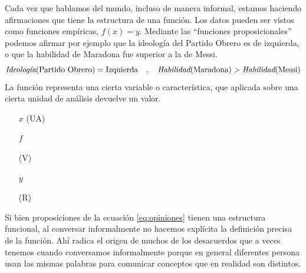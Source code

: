 \documentclass[a4paper,10pt]{book}
\newif\ifen
\newif\ifes
\newcommand{\en}[1]{\ifen#1\fi}
\newcommand{\es}[1]{\ifes#1\fi}
\begin{document}
Cada vez que hablamos del mundo, incluso de manera informal, estamos haciendo afirmaciones que tiene la estructura de una función.
%
Los datos pueden ser vistos como funciones empíricas, $f(x)=y$.
%
Mediante las ``funciones proposicionales'' podemos afirmar por ejemplo que la ideología del Partido Obrero es de izquierda, o que la habilidad de Maradona fue superior a la de Messi.
%
\begin{equation}\label{eq:opiniones}
 \emph{Ideología}(\text{Partido Obrero}) = \text{Izquierda} \  \ \ , \ \ \ \emph{Habilidad}(\text{Maradona}) > \emph{Habilidad}(\text{Messi})
\end{equation}
%
La función representa una cierta variable o característica, que aplicada sobre una cierta unidad de análisis devuelve un valor.
%
\begin{itemize}  \setlength\itemsep{0cm}
 \item[$x$] 
    \textbf{\en{Unit of analysis}} (UA)
 \item[$f$] 
   \en{\textbf{Variable} of the unit of analysis}
   \es{\textbf{Variable} de la unidad de análisis} (V)
 \item[$y$] 
   \en{\textbf{Value} of the variable}
   \es{\textbf{Resultado} o valor de la variable} (R)
\end{itemize}

Si bien proposiciones de la ecuación \ref{eq:opiniones} tienen una estructura funcional, al conversar informalmente no hacemos explícita la definición precisa de la función.
%
Ahí radica el origen de muchos de los desacuerdos que a veces tenemos cuando conversamos informalmente porque en general diferentes persona usan las mismas palabras para comunicar conceptos que en realidad son distintos.

%
\end{document}
